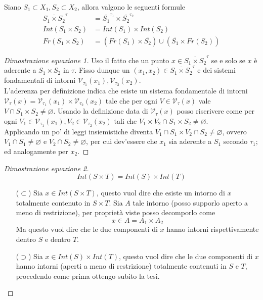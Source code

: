 \begin{theorem}
	Siano $S_1 \subset X_1, S_2 \subset X_2$, allora valgono le seguenti formule
	\begin{align*}
		\overline{S_1\times S_2}^{\tau} & = \overline{S_1}^{\tau_1} \times \overline{S_2}^{\tau_2} \\
		Int(S_1 \times S_2) & = Int(S_1) \times Int(S_2)\\
		Fr(S_1 \times S_2) &= (Fr(S_1) \times \overline{S_2}) \cup (\overline{S_1} \times Fr(S_2))
	\end{align*}
\end{theorem}
\begin{proof}[Dimostrazione equazione 1]
	Uso il fatto che un punto $x \in \overline{S_1\times S_2}^\tau$ se e solo se $x$ è aderente a $S_1 \times S_2$ in $\tau$. Fisso dunque un $(x_1, x_2) \in \overline{S_1\times S_2}^\tau$ e dei sistemi fondamentali di intorni $\mathcal{V}_{\tau_1}(x_1), \mathcal{V}_{\tau_2}(x_2)$.\\
	L'aderenza per definizione indica che esiste un sistema fondamentale di intorni $\mathcal{V}_\tau(x) = \mathcal{V}_{\tau_1}(x_1) \times \mathcal{V}_{\tau_2}(x_2)$ tale che per ogni $V \in \mathcal{V}_\tau(x)$ vale $V \cap S_1 \times S_2 \neq \varnothing$. Usando la definizione data di $\mathcal{V}_\tau(x)$ posso riscrivere come per ogni $V_1 \in \mathcal{V}_{\tau_1}(x_1), V_2 \in \mathcal{V}_{\tau_2}(x_2)$ tali che $V_1 \times V_2 \cap S_1 \times S_2 \neq \varnothing$. \\ 
	Applicando un po' di leggi insiemistiche diventa $V_1 \cap S_1 \times V_2 \cap S_2 \neq \varnothing$, ovvero $V_1 \cap S_1 \neq \varnothing$ e $V_2 \cap S_2\neq \varnothing$, per cui dev'essere che $x_1$ sia aderente a $S_1$ secondo $\tau_1$; ed analogamente per $x_2$. 
\end{proof}
\begin{proof}[Dimostrazione equazione 2]
		\begin{equation*}
		Int(S \times T) = Int(S) \times Int(T)
		\end{equation*}
	\begin{itemize}
		\item[($\subset$)] Sia $x \in Int(S \times T)$, questo vuol dire che esiste un intorno di $x$ totalmente contenuto in $S \times T$. Sia $A$ tale intorno (posso supporlo aperto a meno di restrizione), per proprietà viste posso decomporlo come 
		\begin{equation*}
		x \in A = A_1 \times A_2 
		\end{equation*}
		Ma questo vuol dire che le due componenti di $x$ hanno intorni rispettivamente dentro $S$ e dentro $T$.
		\item[($\supset$)] Sia $x \in Int(S) \times Int(T)$, questo vuol dire che le due componenti di $x$ hanno intorni (aperti a meno di restrizione) totalmente contenuti in $S$ e $T$, procedendo come prima ottengo subito la tesi.
	\end{itemize}
\end{proof}
